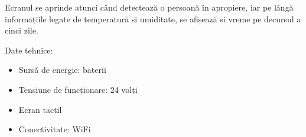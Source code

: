 	Ecranul se aprinde atunci când detectează o persoană în apropiere, iar pe lângă informațiile legate de temperatură si umiditate, se afișează si vreme pe decursul a cinci zile.

\vspace{2em}

	Date tehnice:
	\begin{itemize}
	\setlength{\itemindent}{2em}
		\item Sursă de energie: baterii
		\item Tensiune de funcționare: 24 volți
		\item Ecran tactil
		\item Conectivitate: WiFi
	\end{itemize}

